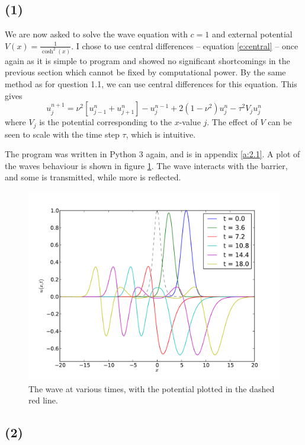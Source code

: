 \documentclass[10pt]{article}
\newcommand{\ujn}{u_{j}^{n}}
\newcommand{\ujpn}{u_{j+1}^{n}}
\newcommand{\ujmn}{u_{j-1}^{n}}
\newcommand{\ujnp}{u_{j}^{n+1}}
\newcommand{\ujnm}{u_{j}^{n-1}}
\begin{document}
\subsection*{(1)}
We are now asked to solve the wave equation with $c=1$ and external potential
$V(x) = \frac{1}{\cosh^2(x)}$.
I chose to use central differences -- equation \ref{e:central} -- once again as it
is simple to program and showed no significant shortcomings in the previous
section which cannot be fixed by computational power.
By the same method as for question 1.1, we can use central differences for this
equation. This gives
\begin{equation}
\ujnp = \nu^2 \left[\ujmn + \ujpn \right] - \ujnm + 2(1 - \nu^2)\ujn - \tau^2 V_j \ujn
\label{e:cdp}
\end{equation}
where $V_j$ is the potential corresponding to the $x$-value $j$. The effect of
$V$ can be seen to scale with the time step $\tau$, which is intuitive.

The program was written in Python 3 again, and is in appendix \ref{a:2.1}.
A plot of the waves behaviour is shown in figure \ref{f:cosh}.
The wave interacts with the barrier, and some is transmitted, while more
is reflected.

\begin{figure}
  \centering
  \includegraphics[width=\textwidth]{2/cosh.pdf}
  \caption{The wave at various times, with the potential plotted in the dashed red line.}
  \label{f:cosh}
\end{figure}



\subsection*{(2)}
\end{document}
